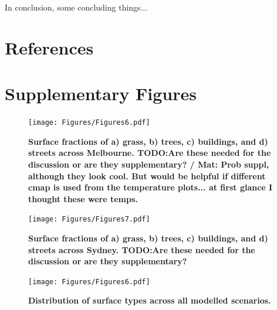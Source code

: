 \documentclass[final,3p,times,authoryear]{elsarticle}
\begin{document}
In conclusion, some concluding things...

\printglossaries

\section*{References}\label{sec:ref}
 



\clearpage
%


\section{Supplementary Figures}\label{sec:suppfig}
\begin{figure}
\centering
\texttt{[image: Figures/Figures6.pdf]}
\caption{\bf Surface fractions of a) grass, b) trees, c) buildings, and d) streets across Melbourne. TODO:Are these needed for the discussion or are they supplementary? / Mat: Prob suppl, although they look cool. But would be helpful if different cmap is used from the temperature plots... at first glance I thought these were temps.}
 \label{fig:melfracs}
\end{figure}

\begin{figure}
\centering
\texttt{[image: Figures/Figures7.pdf]}
\caption{\bf Surface fractions of a) grass, b) trees, c) buildings, and d) streets across Sydney. TODO:Are these needed for the discussion or are they supplementary?}
 \label{fig:sydfracs}
\end{figure}


\begin{figure}
\centering
\texttt{[image: Figures/Figures6.pdf]}
\caption{\bf Distribution of surface types across all modelled scenarios.}
 \label{fig:surfdist}
\end{figure}
\end{document}
